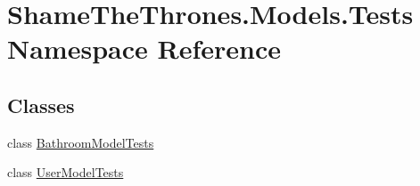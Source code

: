 \hypertarget{namespace_shame_the_thrones_1_1_models_1_1_tests}{}\section{Shame\+The\+Thrones.\+Models.\+Tests Namespace Reference}
\label{namespace_shame_the_thrones_1_1_models_1_1_tests}
\subsection*{Classes}
\begin{DoxyCompactItemize}
\item 
class \hyperlink{class_shame_the_thrones_1_1_models_1_1_tests_1_1_bathroom_model_tests}{Bathroom\+Model\+Tests}
\item 
class \hyperlink{class_shame_the_thrones_1_1_models_1_1_tests_1_1_user_model_tests}{User\+Model\+Tests}
\end{DoxyCompactItemize}
